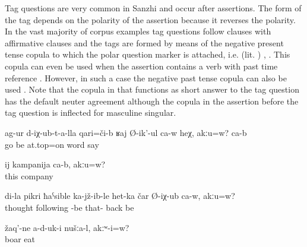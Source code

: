 Tag questions are very common in Sanzhi and occur after assertions. The form of the tag depends on the polarity of the assertion because it reverses the polarity. In the vast majority of corpus examples tag questions follow clauses with affirmative clauses and the tags are formed by means of the negative present tense copula to which the polar question marker  is attached, i.e.  (lit. ) , . This copula can even be used when the assertion contains a verb with past time reference . However, in such a case the negative past tense copula can also be used . Note that the copula in  that functions as short answer to the tag question has the default neuter agreement although the copula in the assertion before the tag question is inflected for masculine singular.
%
\begin{exe}
	\ex	\label{ex:About what had happened he is talking, right? Yes}
	\gll	ag-ur	d-iχ-ub-t-a-lla	qari=či-b 	ʁaj	Ø-ik'-ul	ca-w	heχ,	akːu=w?	ca-b\\
		go	be	at.top=on	word	say				\\
	\glt	{}

	\ex	\label{ex:This is the company (group of friends), right}
	\gll	ij	kampanija	ca-b,	akːu=w?\\
		this	company		\\
	\glt	{}

	\ex	\label{ex:‎In my opinion, he was imprisoned and then came back from there, right}
	\gll	di-la	pikri	ħaˁsible	ka-jž-ib-le	het-ka	čar	Ø-iχ-ub	ca-w,	akːu=w?\\
			thought	following	-be	that-	back be		\\
	\glt	{}

	\ex	\label{ex:‎We did not eat boars, right}
	\gll	žaq'-ne	a-d-uk-i	nušːa-l,	akːʷ-i=w?\\
		boar	eat			\\
	\glt	{}
\end{exe}


